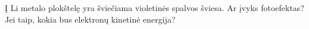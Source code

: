 \question Į Li metalo plokštelę yra šviečiama violetinės spalvos šviesa. Ar įvyks fotoefektas? Jei taip, kokia bus elektronų kinetinė energija?